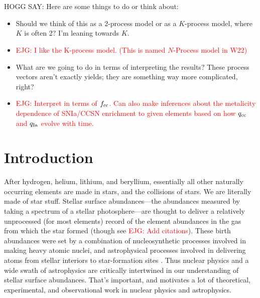 \documentclass[modern]{aastex631}
\newcommand{\fcc}{f_{\rm cc}}
\newcommand{\qIa}{q_{\rm Ia}}
\newcommand{\qcc}{q_{\rm cc}}
\newcommand{\ejg}[1]{\textcolor{red}{EJG: #1}}
\begin{document}

\section*{}\clearpage
HOGG SAY: Here are some things to do or think about:
\begin{itemize}
  \item Should we think of this as a 2-process model or as a $K$-process model, where $K$ is often 2? I'm leaning towards $K$.
  \item \ejg{I like the K-process model. (This is named $N$-Process model in W22)}
  \item What are we going to do in terms of interpreting the results? These process vectors aren't exactly yields; they are something way more complicated, right?
  \item \ejg{Interpret in terms of $\fcc$. Can also make inferences about the metalicity dependence of SNIa/CCSN enrichment to given elements based on how $\qcc$ and $\qIa$ evolve with time.}
\end{itemize}

\section{Introduction}\label{sec:intro}

After hydrogen, helium, lithium, and beryllium, essentially all other naturally occurring elements are made in stars, and the collisions of stars.
We are literally made of star stuff.
Stellar surface abundances---the abundances measured by taking a spectrum of a stellar photosphere---are thought to deliver a relatively unprocessed (for most elements) record of the element abundances in the gas from which the star formed (though see \ejg{Add citations}).
These birth abundances were set by a combination of nucleosynthetic processes involved in making heavy atomic nuclei, and astrophysical processes involved in delivering atoms from stellar interiors to star-formation sites \citep[e.g.,][]{johnsonja2020}.
Thus nuclear physics and a wide swath of astrophysics are critically intertwined in our understanding of stellar surface abundances.
That's important, and motivates a lot of theoretical, experimental, and observational work in nuclear physics and astrophysics.
\end{document}
